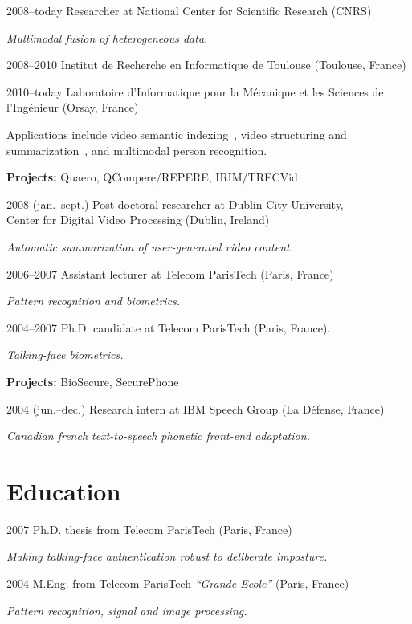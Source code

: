 \documentclass{simplecv}
\begin{document}
\begin{topic}
\item[2008--today] Researcher at National Center for Scientific Research (CNRS)

\emph{Multimodal fusion of heterogeneous data.} 

\begin{topic}
	\item[2008--2010] Institut de Recherche en Informatique de Toulouse (Toulouse, France)
	\item[2010--today] Laboratoire d'Informatique pour la M\'{e}canique et les Sciences de l'Ing\'{e}nieur (Orsay, France)
\end{topic}

Applications include video semantic indexing~\cite{Bredin2012a}, video structuring and summarization~\cite{Bredin2012}, and multimodal person recognition.

\textbf{Projects:} Quaero, QCompere/REPERE, IRIM/TRECVid

\item[2008 (jan.--sept.)] Post-doctoral researcher at Dublin City University,\\ Center for Digital Video Processing (Dublin, Ireland)

\emph{Automatic summarization of user-generated video content.}

\item[2006--2007] Assistant lecturer at Telecom ParisTech (Paris, France)

\emph{Pattern recognition and biometrics.}

\item[2004--2007] Ph.D. candidate at Telecom ParisTech (Paris, France).

\emph{Talking-face biometrics.}

\textbf{Projects:} BioSecure, SecurePhone 

\item[2004 (jun.--dec.)] Research intern at IBM Speech Group (La D\'{e}fense, France)

\emph{Canadian french text-to-speech phonetic front-end adaptation.}
\end{topic}

\section{Education}

\begin{topic}
\item[2007] Ph.D. thesis from Telecom ParisTech (Paris, France)

\emph{Making talking-face authentication robust to deliberate imposture.}

\item[2004] M.Eng. from Telecom ParisTech \emph{``Grande Ecole''} (Paris, France)

\emph{Pattern recognition, signal and image processing.}
\end{topic}
\end{document}
